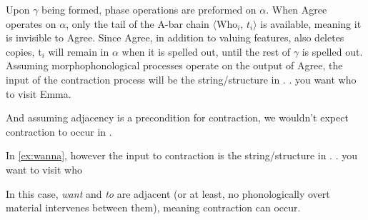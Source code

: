 \documentclass[MilwayThesis]{subfiles}
\begin{document}
Upon $\gamma$ being formed, phase operations are preformed on $\alpha$.
When Agree operates on $\alpha$, only the tail of the A-bar chain $\langle$Who$_i$, $t_i\rangle$ is available, meaning it is invisible to Agree.
Since Agree, in addition to valuing features, also deletes copies, t$_i$ will remain in $\alpha$ when it is spelled out, until the rest of $\gamma$ is spelled out.
Assuming morphophonological processes operate on the output of Agree, the input of the contraction process will be the string/structure in \Next.
\ex. you want who to visit Emma.

And assuming adjacency is a precondition for contraction, we wouldn't expect contraction to occur in \Last.

In \ref{ex:wanna}, however the input to contraction is the string/structure in \Next.
\ex. you want to visit who

In this case, \textit{want} and \textit{to} are adjacent (or at least, no phonologically overt material intervenes between them), meaning contraction can occur.
\end{document}
